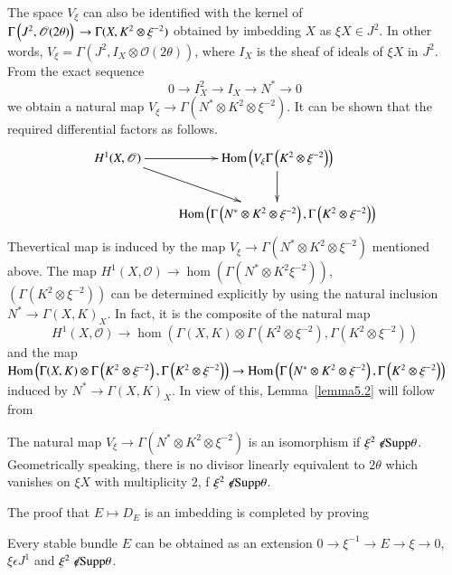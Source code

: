 The space $V_{\xi}$ can also be identified with the kernel of
$\Gamma\left(J^{2},\mathscr{O}(2\theta)\right)\\\to
\Gamma(X,K^{2}\otimes \xi^{-2})$ obtained by imbedding $X$ as $\xi X
\in J^{2}$. In other words, $V_{\xi}=\Gamma\left(J^{2},I_X\otimes
\mathscr{O}(2\theta)\right)$, where $I_X$ is the sheaf of ideals of
$\xi X$ in $J^{2}$. From the exact sequence 
$$
0\to I^{2}_X\to I_X\to N^{\ast}\to 0
$$
we obtain a natural map 
$V_{\xi}\to \Gamma\left(N^{\ast}\otimes K^{2}\otimes \xi^{-2}\right)$. It can be
shown that the required differential factors as follows. 
$$
\xymatrix{H^{1}(X,\mathscr{O})\ar[dr]\ar[r]& \hom\left(V_{\xi}\Gamma\ar[d]\left(K^{2}\otimes \xi^{-2}\right)\right)\\
&\hom\left(\Gamma\left(N^{\ast}\otimes K^{2}\otimes
\xi^{-2}\right),\Gamma\left(K^{2}\otimes \xi^{-2}\right)\right)}
$$
The\pageoriginale vertical map is induced by the map $V_{\xi}\to \Gamma
\left(N^{\ast}\otimes K^{2}\otimes \xi^{-2}\right)$ mentioned
above. The map $H^{1}(X,\mathscr{O})\to \hom \left(\Gamma
\left(N^{\ast}\otimes K^{2}\xi^{-2}\right)\right)$,\\ $\left(\Gamma\left(K^{2}\otimes
\xi^{-2}\right)\right)$ can be determined explicitly by using the
natural inclusion $N^{\ast}\to \Gamma (X,K)_X$. In fact, it is the
composite of the natural map 
$$
H^{1}(X,\mathscr{O})\to \hom\left(\Gamma(X,K)\otimes
\Gamma\left(K^{2}\otimes \xi^{-2}\right), \Gamma\left(K^{2}\otimes \xi^{-2}\right)\right)
$$
and the map $\hom\left(\Gamma(X,K)\otimes \Gamma\left(K^{2}\otimes
\xi^{-2}\right),\Gamma\left(K^{2}\otimes \xi^{-2}\right)\right)\to\\
\hom\left(\Gamma\left(N^{\ast}\otimes K^{2}\otimes
\xi^{-2}\right),\Gamma \left(K^{2}\otimes \xi^{-2}\right)\right)$
induced by $N^{\ast}\to \Gamma(X,K)_X$. In view of this,
Lemma~\ref{lemma5.2} will follow from 

\begin{lemma}\label{lemma5.3}
The natural map $V_{\xi}\to \Gamma\left(N^{\ast}\otimes K^{2}\otimes
\xi^{-2}\right)$ is an isomorphism if $\xi^{2}\notepsilon \Supp
\theta$. Geometrically speaking, there is no divisor linearly
equivalent to $2\theta$ which vanishes on $\xi X$ with multiplicity
$2$, f $\xi^{2}\notepsilon \Supp \theta$.
\end{lemma}

The proof that $E\mapsto D_E$ is an imbedding is completed by proving 

\begin{lemma}\label{lemma5.4}
Every stable bundle $E$ can be obtained as an extension $0\to
\xi^{-1}\to E\to \xi\to 0$, $\xi\epsilon J^{1}$ and
$\xi^{2}\notepsilon \Supp \theta$. 
\end{lemma}

